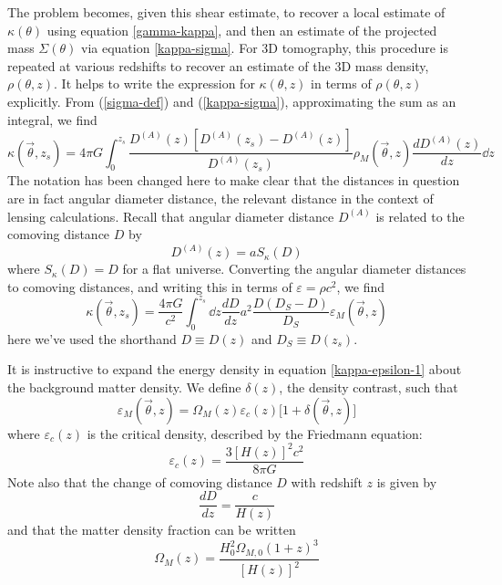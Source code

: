   The problem becomes, 
given this shear estimate, to recover a local estimate of 
$\kappa(\theta)$ using equation \ref{gamma-kappa}, and then an estimate 
of the projected mass $\Sigma(\theta)$ via equation \ref{kappa-sigma}.  
For 3D tomography, this procedure is repeated at various redshifts to recover 
an estimate of the 3D mass density, $\rho(\theta,z)$. It helps to write 
the expression for $\kappa(\theta,z)$ in terms of $\rho(\theta,z)$
 explicitly.  From (\ref{sigma-def}) and (\ref{kappa-sigma}), approximating 
the sum as an integral, we find
\begin{equation}
  \kappa(\vec{\theta},z_s) 
  = 4\pi G \int_0^{z_s} 
  \frac{D^{(A)}(z)[D^{(A)}(z_s)-D^{(A)}(z)]}{D^{(A)}(z_s)} 
  \rho_M(\vec{\theta},z) \frac{dD^{(A)}(z)}{dz} \dd z
\end{equation}
The notation has been changed here to make clear that the distances in 
question are in fact angular diameter distance, the relevant distance 
in the context of lensing calculations.  Recall that angular diameter 
distance $D^{(A)}$ is related to the comoving distance $D$ by
\begin{equation}
  D^{(A)}(z) = a S_\kappa (D)
\end{equation}
where $S_\kappa(D) = D$ for a flat universe.  Converting the angular 
diameter distances to comoving distances, and writing this in terms 
of $\varepsilon = \rho c^2$, we find
\begin{equation}
  \label{kappa-epsilon-1}
  \kappa(\vec{\theta},z_s) 
  = \frac{4\pi G}{c^2} \int_0^{z_s} \dd z\frac{dD}{dz} 
  a^2\frac{D(D_S-D)}{D_S} \varepsilon_M(\vec{\theta},z) 
\end{equation}
here we've used the shorthand $D \equiv D(z)$ and 
$D_S \equiv D(z_s)$.

It is instructive to expand the energy density in equation 
\ref{kappa-epsilon-1} about the background matter density.  
We define $\delta(z)$, the density contrast, such that
\begin{equation}
  \label{delta-def}
  \varepsilon_M(\vec{\theta},z) = \Omega_M(z) \varepsilon_c(z)\Big[1+\delta(\vec{\theta},z)\Big]
\end{equation}
where $\varepsilon_c(z)$ is the critical density, described by the Friedmann equation:
\begin{equation}
  \label{H-def}
  \varepsilon_c(z) = \frac{3 \left[H(z)\right]^2 c^2}{8\pi G}
\end{equation}
Note also that the change of comoving distance $D$ with redshift $z$ is given by
\begin{equation}
  \label{dDdz}
  \frac{dD}{dz} = \frac{c}{H(z)}
\end{equation}
and that the matter density fraction can be written
\begin{equation}
  \Omega_M(z) = \frac{H_0^2\Omega_{M,0}(1+z)^3}{[H(z)]^2}
\end{equation}


